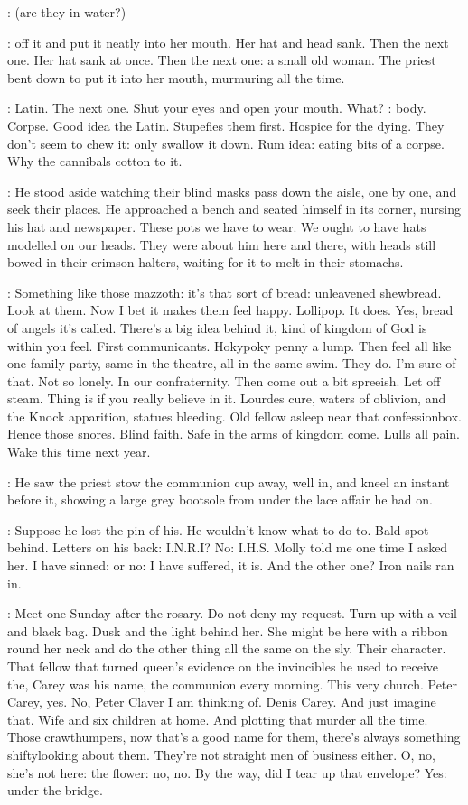 \BloomInt:
(are they in water?)

:
off it and put it neatly into her mouth.
Her hat and head sank.
Then the next one.
Her hat sank at once.
Then the next one:
a small old woman.
The priest bent down to put it into her mouth,
murmuring all the time.

\BloomInt:
Latin.
The next one.
Shut your eyes and open your mouth.
What?
:
body.
Corpse.
Good idea the Latin.
Stupefies them first.
Hospice for the dying.
They don't seem to chew it:
only swallow it down.
Rum idea:
eating bits of a corpse.
Why the cannibals cotton to it.

:
He stood aside
watching their blind masks pass down the aisle,
one by one,
and seek their places.
He approached a bench and seated himself in its corner,
nursing his hat and newspaper.
These pots we have to wear.
We ought to have hats modelled on our heads.
They were about him here and there,
with heads still bowed in their crimson halters,
waiting for it to melt in their stomachs.

\BloomInt:
Something like those mazzoth:
it's that sort of bread:
unleavened shewbread.
Look at them.
Now I bet it makes them feel happy.
Lollipop.
It does.
Yes, bread of angels it's called.
There's a big idea behind it,
kind of kingdom of God is within you feel.
First communicants.
Hokypoky penny a lump.
Then feel all like one family party,
same in the theatre, all in the same swim.
They do.
I'm sure of that.
Not so lonely.
In our confraternity.
Then come out a bit spreeish.
Let off steam.
Thing is if you really believe in it.
Lourdes cure,
waters of oblivion,
and the Knock apparition,
statues bleeding.
Old fellow asleep near that confessionbox.
Hence those snores.
Blind faith.
Safe in the arms of kingdom come.
Lulls all pain.
Wake this time next year.

:
He saw the priest stow the communion cup away,
well in,
and kneel an instant before it,
showing a large grey bootsole from under the lace affair he had on.

\BloomInt:
Suppose he lost the pin of his.
He wouldn't know what to do to.
Bald spot behind.
Letters on his back:
I.N.R.I?
No:
I.H.S.
Molly told me one time I asked her.
I have sinned:
or no:
I have suffered, it is.
And the other one?
Iron nails ran in.

\BloomInt:
Meet one Sunday after the rosary.
Do not deny my request.
Turn up with a veil and black bag.
Dusk and the light behind her.
She might be here with a ribbon round her neck
and do the other thing all the same on the sly.
Their character.
That fellow that turned queen's evidence on the invincibles
he used to receive the,
Carey was his name,
the communion every morning.
This very church.
Peter Carey, yes.
No, Peter Claver I am
thinking of.
Denis Carey.
And just imagine that.
Wife and six children at home.
And plotting that murder all the time.
Those crawthumpers,
now that's a good name for them,
there's always something shiftylooking about them.
They're not straight men of business either.
O, no, she's not here:
the flower:
no, no.
By the way, did I tear up that envelope?
Yes: under the bridge.

